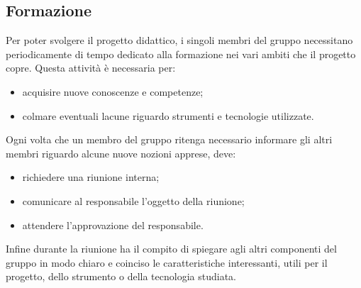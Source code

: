 \subsection{Formazione}\label{form}
Per poter svolgere il progetto didattico, i singoli membri del gruppo necessitano periodicamente di tempo dedicato alla formazione nei vari ambiti che il progetto copre. Questa attività è necessaria per:
\begin{itemize}
	\item acquisire nuove conoscenze e competenze;
	\item colmare eventuali lacune riguardo strumenti e tecnologie utilizzate.
\end{itemize}
Ogni volta che un membro del gruppo ritenga necessario informare gli altri membri riguardo alcune nuove nozioni apprese, deve:
\begin{itemize}
	\item richiedere una riunione interna;
	\item comunicare al responsabile l'oggetto della riunione;
	\item attendere l'approvazione del responsabile.
\end{itemize}
Infine durante la riunione ha il compito di spiegare agli altri componenti del gruppo in modo chiaro e coinciso le caratteristiche interessanti, utili per il progetto, dello strumento o della tecnologia studiata.
